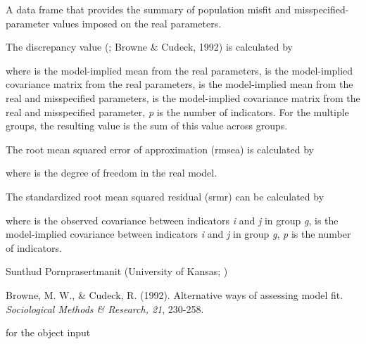 \documentclass[a4paper]{book}
\begin{document}
\begin{Value}
A data frame that provides the summary of population misfit and misspecified-parameter values imposed on the real parameters.

The discrepancy value (; Browne \& Cudeck, 1992) is calculated by


where \eqn{\mu}{} is the model-implied mean from the real parameters, \eqn{\Sigma}{} is the model-implied covariance matrix from the real parameters, \eqn{\tilde{\mu}}{} is the model-implied mean from the real and misspecified parameters, \eqn{\tilde{\Sigma}}{} is the model-implied covariance matrix from the real and misspecified parameter, \emph{p} is the number of indicators. For the multiple groups, the resulting  value is the sum of this value across groups.

The root mean squared error of approximation (rmsea) is calculated by


where  is the degree of freedom in the real model.

The standardized root mean squared residual (srmr) can be calculated by


where  is the observed covariance between indicators \emph{i} and \emph{j} in group \emph{g},  is the model-implied covariance between indicators \emph{i} and \emph{j} in group \emph{g}, \emph{p} is the number of indicators.

\end{Value}
%
\begin{Author}\relax
Sunthud Pornprasertmanit (University of Kansas; )
\end{Author}
%
\begin{References}\relax
Browne, M. W., \& Cudeck, R. (1992). Alternative ways of assessing model fit. \emph{Sociological Methods \& Research, 21}, 230-258.
\end{References}
%
\begin{SeeAlso}\relax
{} for the object input
\end{SeeAlso}
\end{document}
